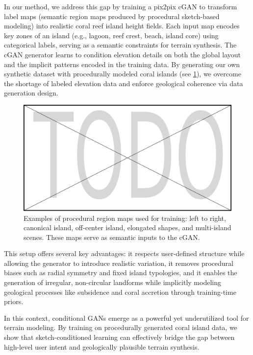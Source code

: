 \midConclusion

In our method, we address this gap by training a pix2pix cGAN to transform label maps (semantic region maps produced by procedural sketch-based modeling) into realistic coral reef island height fields. Each input map encodes key zones of an island (e.g., lagoon, reef crest, beach, island core) using categorical labels, serving as a semantic constraints for terrain synthesis. The cGAN generator learns to condition elevation details on both the global layout and the implicit patterns encoded in the training data. By generating our own synthetic dataset with procedurally modeled coral islands (see \cref{fig:coral-island_difficulties-dataset}), we overcome the shortage of labeled elevation data and enforce geological coherence via data generation design.

\begin{figure}[H]
\includegraphics[width=0.9 \linewidth]{placeholder.pdf}
\caption{Examples of procedural region maps used for training: left to right, canonical island, off-center island, elongated shapes, and multi-island scenes. These maps serve as semantic inputs to the cGAN.}
\label{fig:coral-island_difficulties-dataset}
\end{figure}

This setup offers several key advantages: it respects user-defined structure while allowing the generator to introduce realistic variation, it removes procedural biases such as radial symmetry and fixed island typologies, and it enables the generation of irregular, non-circular landforms while implicitly modeling geological processes like subsidence and coral accretion through training-time priors. 

In this context, conditional GANs emerge as a powerful yet underutilized tool for terrain modeling. By training on procedurally generated coral island data, we show that sketch-conditioned learning can effectively bridge the gap between high-level user intent and geologically plausible terrain synthesis.





